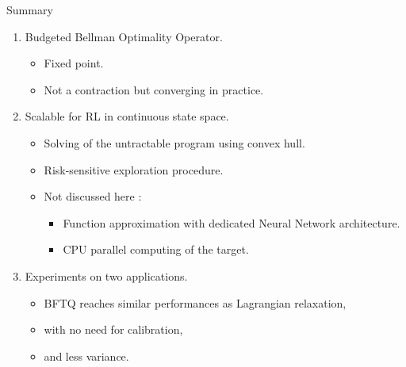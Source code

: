 \documentclass{beamer}
\begin{document}
    \begin{frame}{Summary}

        \begin{enumerate}[+]
            \pause\item<1-> Budgeted Bellman Optimality Operator.
            \begin{itemize}
                \pause\item Fixed point.
                \pause\item Not a contraction but converging in practice.
            \end{itemize}
            \pause\item<2-> Scalable for RL in continuous state space.
            \begin{itemize}
                \pause\item Solving of the untractable program using convex hull.
                \pause\item Risk-sensitive exploration procedure.
                \pause \item Not discussed here :
                \begin{itemize}
                    \pause\item Function approximation with dedicated Neural Network architecture.
                    \pause\item CPU parallel computing of the target.
                \end{itemize}
            \end{itemize}

            \pause\item<3-> Experiments on two applications.
            \begin{itemize}
                \pause\item BFTQ reaches similar performances as Lagrangian relaxation,
                \pause\item with no need for calibration,
                \pause\item and less variance.
            \end{itemize}
        \end{enumerate}

    \end{frame}
\end{document}
